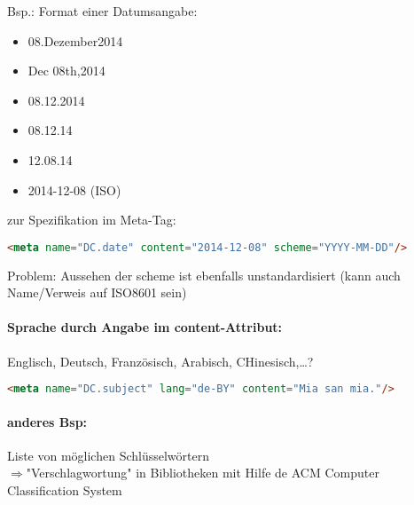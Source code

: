 Bsp.: Format einer Datumsangabe:\\
\begin{itemize}
\item 08.Dezember2014
\item Dec 08th,2014
\item 08.12.2014
\item 08.12.14
\item 12.08.14
\item 2014-12-08 (ISO)
\end{itemize}
zur Spezifikation im Meta-Tag:
\begin{lstlisting}[caption={Div. Inhalte von Name}, label={lst:beispieleNAME}, language={HTML}]
<meta name="DC.date" content="2014-12-08" scheme="YYYY-MM-DD"/>
\end{lstlisting}
Problem: Aussehen der scheme ist ebenfalls unstandardisiert (kann auch Name/Verweis auf ISO8601 sein)

\paragraph{Sprache durch Angabe im content-Attribut:} Englisch, Deutsch, Französisch, Arabisch, CHinesisch,\dots ?
\begin{lstlisting}[caption={Div. Inhalte von Name}, label={lst:beispieleNAME}, language={HTML}]
<meta name="DC.subject" lang="de-BY" content="Mia san mia."/>
\end{lstlisting}

\paragraph{anderes Bsp:}Liste von möglichen Schlüsselwörtern\\
$\Rightarrow$"Verschlagwortung" in Bibliotheken mit Hilfe de ACM Computer Classification System

